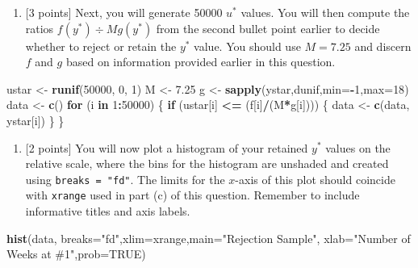 \documentclass[
]{article}
\newenvironment{Shaded}{\begin{snugshade}}{\end{snugshade}}
\newcommand{\AttributeTok}[1]{\textcolor[rgb]{0.13,0.29,0.53}{#1}}
\newcommand{\ConstantTok}[1]{\textcolor[rgb]{0.56,0.35,0.01}{#1}}
\newcommand{\ControlFlowTok}[1]{\textcolor[rgb]{0.13,0.29,0.53}{\textbf{#1}}}
\newcommand{\DecValTok}[1]{\textcolor[rgb]{0.00,0.00,0.81}{#1}}
\newcommand{\FloatTok}[1]{\textcolor[rgb]{0.00,0.00,0.81}{#1}}
\newcommand{\FunctionTok}[1]{\textcolor[rgb]{0.13,0.29,0.53}{\textbf{#1}}}
\newcommand{\NormalTok}[1]{#1}
\newcommand{\OtherTok}[1]{\textcolor[rgb]{0.56,0.35,0.01}{#1}}
\newcommand{\SpecialCharTok}[1]{\textcolor[rgb]{0.81,0.36,0.00}{\textbf{#1}}}
\newcommand{\StringTok}[1]{\textcolor[rgb]{0.31,0.60,0.02}{#1}}
\providecommand{\tightlist}{%
  \setlength{\itemsep}{0pt}\setlength{\parskip}{0pt}}
\begin{document}
\begin{enumerate}
\def\labelenumi{(\alph{enumi})}
\setcounter{enumi}{4}
\tightlist
\item
  {[}3 points{]} Next, you will generate 50000 \(u^*\) values. You will
  then compute the ratios \(f(y^*) \div Mg(y^*)\) from the second bullet
  point earlier to decide whether to reject or retain the \(y^*\) value.
  You should use \(M = 7.25\) and discern \(f\) and \(g\) based on
  information provided earlier in this question.
\end{enumerate}

\begin{Shaded}
\begin{Highlighting}[]
\NormalTok{ustar }\OtherTok{\textless{}{-}} \FunctionTok{runif}\NormalTok{(}\DecValTok{50000}\NormalTok{, }\DecValTok{0}\NormalTok{, }\DecValTok{1}\NormalTok{)}
\NormalTok{M }\OtherTok{\textless{}{-}} \FloatTok{7.25}
\NormalTok{g }\OtherTok{\textless{}{-}} \FunctionTok{sapply}\NormalTok{(ystar,dunif,}\AttributeTok{min=}\SpecialCharTok{{-}}\DecValTok{1}\NormalTok{,}\AttributeTok{max=}\DecValTok{18}\NormalTok{)}
\NormalTok{data }\OtherTok{\textless{}{-}} \FunctionTok{c}\NormalTok{()}
\ControlFlowTok{for}\NormalTok{ (i }\ControlFlowTok{in} \DecValTok{1}\SpecialCharTok{:}\DecValTok{50000}\NormalTok{) \{}
  \ControlFlowTok{if}\NormalTok{ (ustar[i] }\SpecialCharTok{\textless{}=}\NormalTok{ (f[i]}\SpecialCharTok{/}\NormalTok{(M}\SpecialCharTok{*}\NormalTok{g[i]))) \{}
\NormalTok{    data }\OtherTok{\textless{}{-}} \FunctionTok{c}\NormalTok{(data, ystar[i])}
\NormalTok{  \}}
\NormalTok{\}}
\end{Highlighting}
\end{Shaded}

\begin{enumerate}
\def\labelenumi{(\alph{enumi})}
\setcounter{enumi}{5}
\tightlist
\item
  {[}2 points{]} You will now plot a histogram of your retained \(y^*\)
  values on the relative scale, where the bins for the histogram are
  unshaded and created using \texttt{breaks\ =\ "fd"}. The limits for
  the \(x\)-axis of this plot should coincide with \texttt{xrange} used
  in part (c) of this question. Remember to include informative titles
  and axis labels.
\end{enumerate}

\begin{Shaded}
\begin{Highlighting}[]
\FunctionTok{hist}\NormalTok{(data, }\AttributeTok{breaks=}\StringTok{"fd"}\NormalTok{,}\AttributeTok{xlim=}\NormalTok{xrange,}\AttributeTok{main=}\StringTok{"Rejection Sample"}\NormalTok{, }\AttributeTok{xlab=}\StringTok{"Number of Weeks at \#1"}\NormalTok{,}\AttributeTok{prob=}\ConstantTok{TRUE}\NormalTok{)}
\end{Highlighting}
\end{Shaded}
\end{document}
